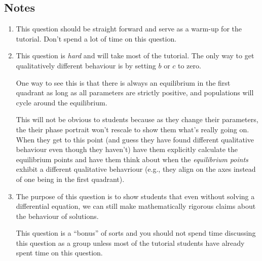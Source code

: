 \subsection*{Notes}
		\begin{enumerate}
			\item This question should be straight forward and serve
				as a warm-up for the tutorial. Don't spend a lot
				of time on this question.
			\item This question is \emph{hard} and will take most of the
				tutorial. The only way to get qualitatively different
				behaviour is by setting $b$ or $c$ to zero.

				One way to see this is that there is always an
				equilibrium in the first quadrant as long as all
				parameters are strictly positive,
				and populations will cycle around the equilibrium.

				This will not be obvious to students because as they
				change their parameters, the their phase
				portrait won't rescale to show them what's really going
				on. When they get to this point (and guess they have found
				different qualitative behaviour even though they haven't)
				have them explicitly calculate the equilibrium points
				and have them think about when the \emph{equilibrium
				points} exhibit a different qualitative behavriour
				(e.g., they align on the axes instead of one being
				in the first quadrant).
			\item The purpose of this question is to show students that
				even without solving a differential equation, we can
				still make mathematically rigorous claims about the
				behaviour of solutions.

				This question is a ``bonus'' of sorts and you should not
				spend time discussing this question as a group unless
				most of the tutorial students have already spent time on this question.
		\end{enumerate}
